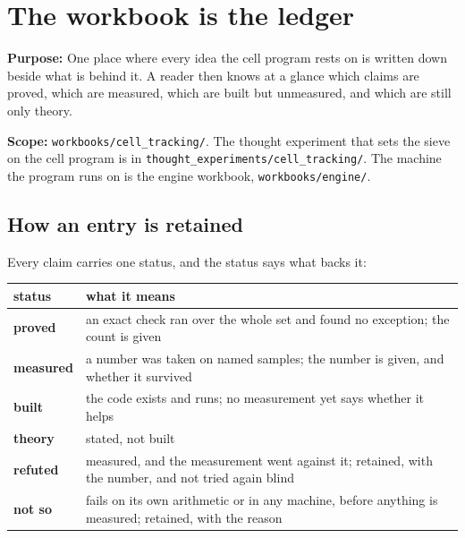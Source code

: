 \chapter{\texorpdfstring{The workbook is the ledger}{The workbook is the ledger}}
\label{chap:readme}

\textbf{Purpose:} One place where every idea the cell program rests on is written down beside what is behind it. A reader then knows at a glance which claims are proved, which are measured, which are built but unmeasured, and which are still only theory.

\textbf{Scope:} \texttt{workbooks/\allowbreak{}cell\_\allowbreak{}tracking/\allowbreak{}}. The thought experiment that sets the sieve on the cell program is in \texttt{thought\_\allowbreak{}experiments/\allowbreak{}cell\_\allowbreak{}tracking/\allowbreak{}}. The machine the program runs on is the engine workbook, \texttt{workbooks/\allowbreak{}engine/\allowbreak{}}.

\section{\texorpdfstring{How an entry is retained}{How an entry is retained}}

Every claim carries one status, and the status says what backs it:

{\small
\setlength{\tabcolsep}{6pt}
\begin{longtable}{>{\RaggedRight\arraybackslash}p{}>{\RaggedRight\arraybackslash}p{}}
\toprule
status & what it means \\
\midrule
\endhead
\textbf{proved} & an exact check ran over the whole set and found no exception; the count is given \\
\textbf{measured} & a number was taken on named samples; the number is given, and whether it survived \\
\textbf{built} & the code exists and runs; no measurement yet says whether it helps \\
\textbf{theory} & stated, not built \\
\textbf{refuted} & measured, and the measurement went against it; retained, with the number, and not tried again blind \\
\textbf{not so} & fails on its own arithmetic or in any machine, before anything is measured; retained, with the reason \\
\bottomrule
\end{longtable}
}

